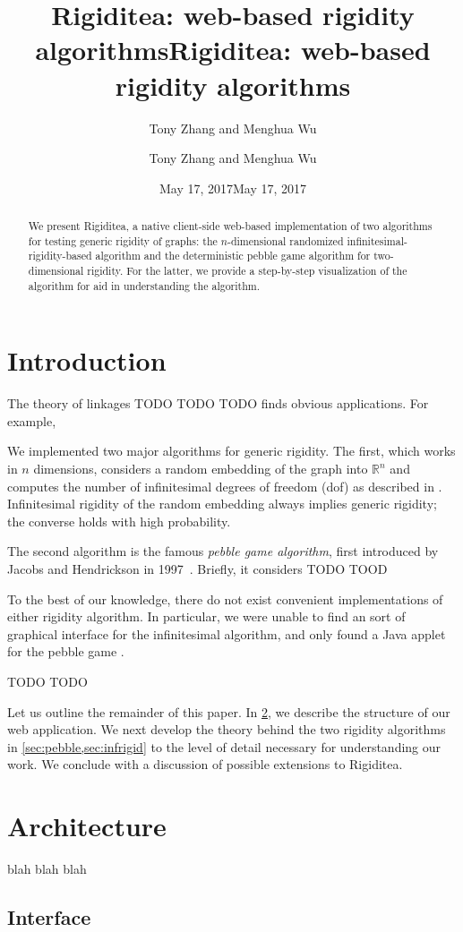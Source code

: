 \documentclass[aps,final,twocolumn,letterpaper,nofootinbib]{revtex4-1}
\title{Rigiditea: web-based rigidity algorithms}
\author{Tony Zhang and Menghua Wu}
\date{May 17, 2017}
\newcommand\RR{\mathbb{R}}
\newcommand\headers{
    \title{Rigiditea: web-based rigidity algorithms}
    \author{Tony Zhang and Menghua Wu}
    \date{May 17, 2017}    
    \begin{abstract}
        We present Rigiditea,
        a native client-side web-based implementation of two algorithms
        for testing generic rigidity of graphs:
        the $n$-dimensional randomized infinitesimal-rigidity-based algorithm
        and the deterministic pebble game algorithm for two-dimensional rigidity.
        For the latter, we provide a step-by-step visualization of the algorithm
        for aid in understanding the algorithm.
    \end{abstract}
}
\begin{document}
\ifrevtex\headers\fi

\maketitle




\tableofcontents

\section{Introduction}

The theory of linkages TODO TODO TODO
finds obvious applications.
For example, 

We implemented two major algorithms for generic rigidity.
The first, which works in $n$ dimensions,
considers a random embedding of the graph into $\RR^n$
and computes the number of infinitesimal degrees of freedom (dof)
as described in \cite[\S4.4.2]{gfalop}.
Infinitesimal rigidity of the random embedding always implies generic rigidity;
the converse holds with high probability.

The second algorithm is the famous \emph{pebble game algorithm},
first introduced by Jacobs and Hendrickson in 1997~\cite{jacobs97}.
Briefly, it considers TODO TOOD

To the best of our knowledge,
there do not exist convenient implementations of
either rigidity algorithm.
In particular,
we were unable to find an sort of graphical interface
for the infinitesimal algorithm,
and only found a Java applet for the pebble game \cite{stjohnapplet}.


TODO TODO

Let us outline the remainder of this paper.
In \cref{sec:arch}, we describe the structure of our web application.
We next develop the theory behind the two rigidity algorithms
in \cref{sec:pebble,sec:infrigid}
to the level of detail necessary for understanding our work.
We conclude with a discussion of possible extensions to Rigiditea.

\section{Architecture}
\label{sec:arch}

blah blah blah

\subsection{Interface}
\end{document}
